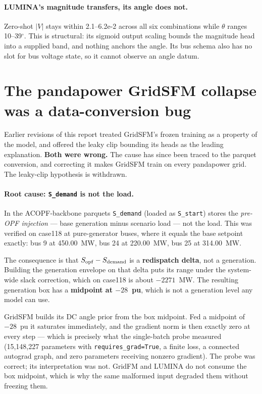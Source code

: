 \documentclass[10pt]{article}
\begin{document}
\paragraph{LUMINA's magnitude transfers, its angle does not.} Zero-shot
\(|V|\) stays within 2.1--6.2e-2 across all six combinations while \(\theta\)
ranges 10--39\(^\circ\). This is structural: its sigmoid output scaling bounds
the magnitude head into a supplied band, and nothing anchors the angle. Its bus
schema also has no slot for bus voltage state, so it cannot observe an angle
datum.

\section{The pandapower GridSFM collapse was a data-conversion bug}
\label{sec:gridsfm}

Earlier revisions of this report treated GridSFM's frozen training as a property
of the model, and offered the leaky clip bounding its heads as the leading
explanation. \textbf{Both were wrong.} The cause has since been traced to the
parquet conversion, and correcting it makes GridSFM train on every pandapower
grid. The leaky-clip hypothesis is withdrawn.

\paragraph{Root cause: \texttt{S\_demand} is not the load.} In the ACOPF-backbone
parquets \texttt{S\_demand} (loaded as \texttt{S\_start}) stores the
\emph{pre-OPF injection} --- base generation minus scenario load --- not the
load. This was verified on case118 at pure-generator buses, where it equals the
base setpoint exactly: bus 9 at 450.00~MW, bus 24 at 220.00~MW, bus 25 at
314.00~MW.

The consequence is that \(S_{\rm opf} - S_{\rm demand}\) is a \textbf{redispatch
delta}, not a generation. Building the generation envelope on that delta puts
its range under the system-wide slack correction, which on case118 is about
\(-2271\)~MW. The resulting generation box has a \textbf{midpoint at
\(-28\)~pu}, which is not a generation level any model can use.

GridSFM builds its DC angle prior from the box midpoint. Fed a midpoint of
\(-28\)~pu it saturates immediately, and the gradient norm is then exactly zero
at every step --- which is precisely what the single-batch probe measured
(15{,}148{,}227 parameters with \texttt{requires\_grad=True}, a finite loss, a
connected autograd graph, and zero parameters receiving nonzero gradient). The
probe was correct; its interpretation was not. GridFM and LUMINA do not consume
the box midpoint, which is why the same malformed input degraded them without
freezing them.
\end{document}
